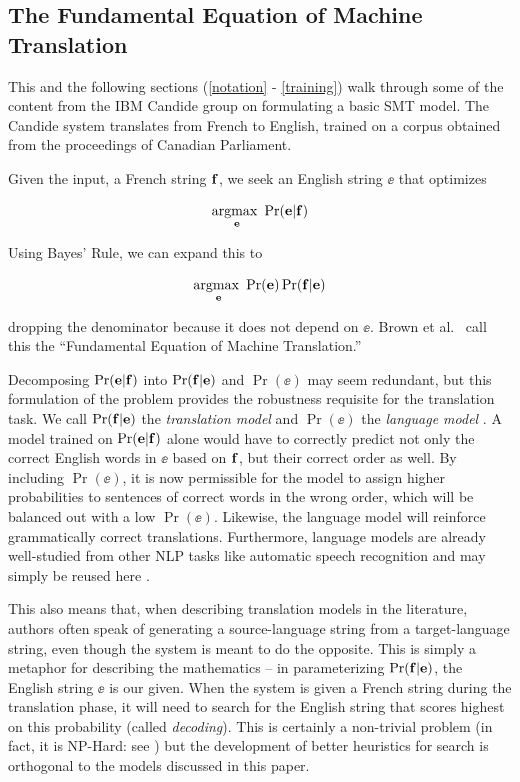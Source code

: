 \documentclass[11pt]{article}
\begin{document}
\subsection{The Fundamental Equation of Machine Translation}
This and the following sections (\ref{notation} - \ref{training}) walk through some of the content from the IBM Candide group \cite{brown:93} on formulating a basic SMT model.
The Candide system translates from French to English, trained on a corpus obtained from
the proceedings of Canadian Parliament.

Given the input, a French string $\mathbf{f}$, we seek an English string $\ee$ that optimizes

\begin{equation}
    \operatorname*{argmax ~}_{\mathbf{e}} \Pr(\mathbf{e} | \mathbf{f})
\end{equation}

Using Bayes' Rule, we can expand this to

\begin{equation} \label{fundamental}
    \operatorname*{argmax ~}_{\mathbf{e}} \Pr(\mathbf{e}) \Pr(\mathbf{f} | \mathbf{e})
\end{equation}

dropping the denominator because it does not depend on $\ee$.
Brown et al.\ \cite{brown:93} call this the ``Fundamental Equation of Machine Translation.''

Decomposing $\Pr(\mathbf{e} | \mathbf{f})$ into $\Pr(\mathbf{f} | \mathbf{e})$ and $\Pr(\ee)$ may seem redundant, 
but this formulation of the problem provides the robustness requisite for the translation task. 
We call $\Pr(\mathbf{f} | \mathbf{e})$ the \textit{translation model} and $\Pr(\ee)$ the \textit{language model} \cite{brown:93}.
A model trained on $\Pr(\mathbf{e} | \mathbf{f})$ alone
would have to correctly predict not only the correct English words in $\ee$ based on $\mathbf{f}$, but
their correct order as well. 
By including $\Pr(\ee)$, it is now permissible for
the model to assign higher probabilities to sentences of correct words in the wrong order, which will
be balanced out with a low $\Pr(\ee)$. Likewise, the language model will reinforce
grammatically correct translations. Furthermore, language models are
already well-studied from other NLP tasks like automatic speech recognition and
may simply be reused here \cite{brown:93, lopez}.

This also means that, when describing translation models in the literature,
authors often speak of generating a source-language string from a target-language string,
even though the system is meant to do the opposite.
This is simply a metaphor for describing the mathematics -- in parameterizing $\Pr(\mathbf{f} | \mathbf{e})$, 
the English string $\ee$ is our given. When the system is given a French string
during the translation phase, it will need to search for the English string that scores highest on this probability
(called \textit{decoding}).
This is certainly a non-trivial problem (in fact, it is NP-Hard: see \cite{knight:99}) 
but the development of better heuristics for search is orthogonal to the models discussed in this paper.
\end{document}
